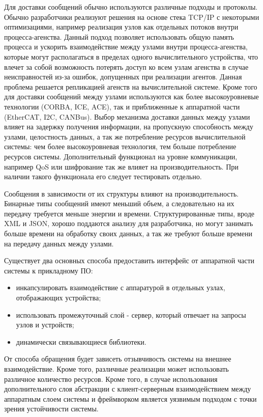 \begin{description}[noitemsep]
	\item [Протоколы коммуникации.] Для доставки сообщений обычно используются различные подходы и протоколы. Обычно разработчики реализуют решения на основе стека TCP/IP с некоторыми оптимизациями, например реализация узлов как отдельных потоков внутри процесса-агенства. Данный подход позволяет использовать общую память процесса и ускорить взаимодействие между узлами внутри процесса-агенства, которые могут располагаться в пределах одного вычислительного устройства, что влечет за собой возможность потерять доступ ко всем узлам агенства в случае неисправностей из-за ошибок, допущенных при реализации агентов. Данная проблема решается репликацией агенств на вычислительной системе. Кроме того для доставки сообщений между узлами используются как более высокоуровневые технологии (CORBA, ICE, ACE), так и приближенные к аппаратной части (EtherCAT, I2C, CANBus). Выбор механизма доставки данных между узлами влияет на задержку получения информации, на пропускную способность между узлами, целостность данных, а так же потребление ресурсов вычислительной системы: чем более высокоуровневая технология, тем больше потребление ресурсов системы. Дополнительный функционал на уровне коммуникации, например QoS или шифрование так же влияет на производительность. При наличии такого функционала его следует тестировать отдельно.

	\item [Формат сообщений.] Сообщения в зависимости от их структуры влияют на производительность. Бинарные типы сообщений имеют меньший объем, а следовательно на их передачу требуется меньше энергии и времени. Структурированные типы, вроде XML и JSON, хорошо поддаются анализу для разработчика, но могут занимать больше времени на обработку своих данных, а так же требуют больше времени на передачу данных между узлами.

	\item [Способ взаимодействия с аппаратурой.] Существует два основных способа предоставить интерфейс от аппаратной части системы к прикладному ПО:
	\begin{itemize}[noitemsep]
		\item инкапсулировать взаимодействие с аппаратурой в отдельных узлах, отображающих устройства;
		\item использовать промежуточный слой - сервер, который отвечает на запросы узлов и устройств;
		\item динамически связывающиеся библиотеки.
	\end{itemize}
	
	От способа обращения будет зависеть отзывчивость системы на внешнее взаимодействие. Кроме того, различные реализации может использовать различное количество ресурсов. Кроме того, в случае использования дополнительного слоя абстракции с клиент-серверным взаимодействием между аппаратным слоем системы и фреймворком является уязвимым подходом с точки зрения устойчивости системы.

\end{description}

